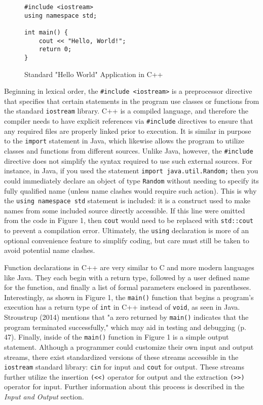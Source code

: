 \documentclass[11pt]{article}
\begin{document}
\begin{figure}[!h]
\centering
\begin{BVerbatim}
#include <iostream>
using namespace std;

int main() {
	cout << "Hello, World!";
	return 0;
}
\end{BVerbatim}
\caption{Standard "Hello World" Application in C++}
\end{figure} \FloatBarrier

\noindent
Beginning in lexical order, the \texttt{\#include <iostream>} is a preprocessor directive that specifies that certain statements in the program use classes or functions from the standard \texttt{iostream} library.  C++ is a compiled language, and therefore the compiler needs to have explicit references via \texttt{\#include} directives to ensure that any required files are properly linked prior to execution.  It is similar in purpose to the \texttt{import} statement in Java, which likewise allows the program to utilize classes and functions from different sources.  Unlike Java, however, the \texttt{\#include} directive does not simplify the syntax required to use such external sources.  For instance, in Java, if you used the statement \texttt{import java.util.Random;} then you could immediately declare an object of type \texttt{Random} without needing to specify its fully qualified name (unless name clashes would require such action).  This is why the \texttt{using namespace std} statement is included: it is a construct used to make names from some included source directly accessible.  If this line were omitted from the code in Figure 1, then \texttt{cout} would need to be replaced with \texttt{std::cout} to prevent a compilation error.  Ultimately, the \texttt{using} declaration is more of an optional convenience feature to simplify coding, but care must still be taken to avoid potential name clashes.

	Function declarations in C++ are very similar to C and more modern languages like Java.  They each begin with a return type, followed by a user defined name for the function, and finally a list of formal parameters enclosed in parentheses.  Interestingly, as shown in Figure 1, the \texttt{main()} function that begins a program's execution has a return type of \texttt{int} in C++ instead of \texttt{void}, as seen in Java.  Stroustrup (2014) mentions that "a zero returned by \texttt{main()} indicates that the program terminated successfully," which may aid in testing and debugging (p. 47).  Finally, inside of the \texttt{main()} function in Figure 1 is a simple output statement.  Although a programmer could customize their own input and output streams, there exist standardized versions of these streams accessible in the \texttt{iostream} standard library: \texttt{cin} for input and \texttt{cout} for output.  These streams further utilize the insertion \texttt{(<<)} operator for output and the extraction \texttt{(>>)} operator for input.  Further information about this process is described in the \textit{Input and Output} section.
	
\end{document}
